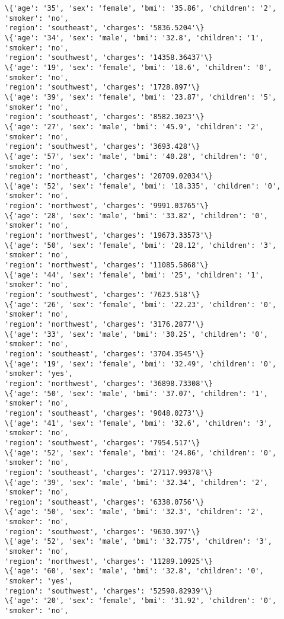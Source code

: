 \documentclass[11pt]{article}
\begin{document}
\begin{Verbatim}[commandchars=\\\{\}]
\{'age': '35', 'sex': 'female', 'bmi': '35.86', 'children': '2', 'smoker': 'no',
'region': 'southeast', 'charges': '5836.5204'\}
\{'age': '34', 'sex': 'male', 'bmi': '32.8', 'children': '1', 'smoker': 'no',
'region': 'southwest', 'charges': '14358.36437'\}
\{'age': '19', 'sex': 'female', 'bmi': '18.6', 'children': '0', 'smoker': 'no',
'region': 'southwest', 'charges': '1728.897'\}
\{'age': '39', 'sex': 'female', 'bmi': '23.87', 'children': '5', 'smoker': 'no',
'region': 'southeast', 'charges': '8582.3023'\}
\{'age': '27', 'sex': 'male', 'bmi': '45.9', 'children': '2', 'smoker': 'no',
'region': 'southwest', 'charges': '3693.428'\}
\{'age': '57', 'sex': 'male', 'bmi': '40.28', 'children': '0', 'smoker': 'no',
'region': 'northeast', 'charges': '20709.02034'\}
\{'age': '52', 'sex': 'female', 'bmi': '18.335', 'children': '0', 'smoker': 'no',
'region': 'northwest', 'charges': '9991.03765'\}
\{'age': '28', 'sex': 'male', 'bmi': '33.82', 'children': '0', 'smoker': 'no',
'region': 'northwest', 'charges': '19673.33573'\}
\{'age': '50', 'sex': 'female', 'bmi': '28.12', 'children': '3', 'smoker': 'no',
'region': 'northwest', 'charges': '11085.5868'\}
\{'age': '44', 'sex': 'female', 'bmi': '25', 'children': '1', 'smoker': 'no',
'region': 'southwest', 'charges': '7623.518'\}
\{'age': '26', 'sex': 'female', 'bmi': '22.23', 'children': '0', 'smoker': 'no',
'region': 'northwest', 'charges': '3176.2877'\}
\{'age': '33', 'sex': 'male', 'bmi': '30.25', 'children': '0', 'smoker': 'no',
'region': 'southeast', 'charges': '3704.3545'\}
\{'age': '19', 'sex': 'female', 'bmi': '32.49', 'children': '0', 'smoker': 'yes',
'region': 'northwest', 'charges': '36898.73308'\}
\{'age': '50', 'sex': 'male', 'bmi': '37.07', 'children': '1', 'smoker': 'no',
'region': 'southeast', 'charges': '9048.0273'\}
\{'age': '41', 'sex': 'female', 'bmi': '32.6', 'children': '3', 'smoker': 'no',
'region': 'southwest', 'charges': '7954.517'\}
\{'age': '52', 'sex': 'female', 'bmi': '24.86', 'children': '0', 'smoker': 'no',
'region': 'southeast', 'charges': '27117.99378'\}
\{'age': '39', 'sex': 'male', 'bmi': '32.34', 'children': '2', 'smoker': 'no',
'region': 'southeast', 'charges': '6338.0756'\}
\{'age': '50', 'sex': 'male', 'bmi': '32.3', 'children': '2', 'smoker': 'no',
'region': 'southwest', 'charges': '9630.397'\}
\{'age': '52', 'sex': 'male', 'bmi': '32.775', 'children': '3', 'smoker': 'no',
'region': 'northwest', 'charges': '11289.10925'\}
\{'age': '60', 'sex': 'male', 'bmi': '32.8', 'children': '0', 'smoker': 'yes',
'region': 'southwest', 'charges': '52590.82939'\}
\{'age': '20', 'sex': 'female', 'bmi': '31.92', 'children': '0', 'smoker': 'no',

\end{Verbatim}
\end{document}
